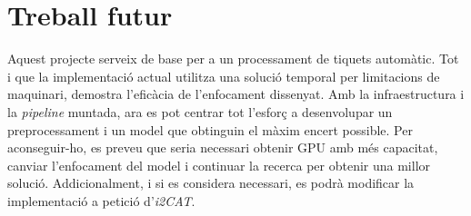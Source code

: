 \section{Treball futur}
Aquest projecte serveix de base per a un processament de tiquets automàtic. Tot i que la implementació actual utilitza una solució temporal per limitacions de maquinari, demostra l'eficàcia de l'enfocament dissenyat. Amb la infraestructura i la \textit{pipeline} muntada, ara es pot centrar tot l'esforç a desenvolupar un preprocessament i un model que obtinguin el màxim encert possible. Per aconseguir-ho, es preveu que seria necessari obtenir GPU amb més capacitat, canviar l'enfocament del model i continuar la recerca per obtenir una millor solució. Addicionalment, i si es considera necessari, es podrà modificar la implementació a petició d'\textit{i2CAT}.
